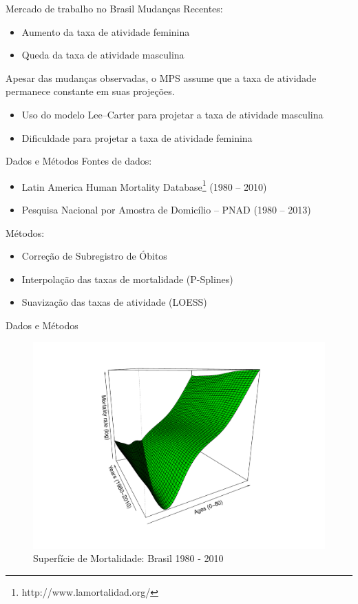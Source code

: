 \documentclass{beamer}
\begin{document}
\begin{frame}{Mercado de trabalho no Brasil}
Mudanças Recentes:
	\begin{itemize}
		\item{Aumento da taxa de atividade feminina}
		\item{Queda da taxa de atividade masculina}
	\end{itemize}
Apesar das mudanças observadas, o MPS assume que a taxa de atividade permanece constante em suas projeções. 
	\begin{itemize}
		\item{Uso do modelo Lee--Carter para projetar a taxa de atividade masculina}
		\item{Dificuldade para projetar a taxa de atividade feminina}
	\end{itemize}
\end{frame}

\begin{frame}{Dados e Métodos}
Fontes de dados:
	\begin{itemize}
		\item{Latin America Human Mortality Database\footnote{http://www.lamortalidad.org/} (1980 -- 2010)}
		\item{Pesquisa Nacional por Amostra de Domicílio -- PNAD (1980 -- 2013)}
	\end{itemize}	
Métodos:
	\begin{itemize}
		\item{Correção de Subregistro de Óbitos} 
		\item{Interpolação das taxas de mortalidade (P-Splines)}
		\item{Suavização das taxas de atividade (LOESS)}
	\end{itemize}
\end{frame}

\begin{frame}{Dados e Métodos}
	\begin{figure}[!htb]
		\caption{Superfície de Mortalidade: Brasil 1980 - 2010}
		\begin{center}
			\includegraphics[scale = 0.3]{Graphs/MortalitySurface.pdf}
		\end{center}
	\end{figure} 
\end{frame}
\end{document}
